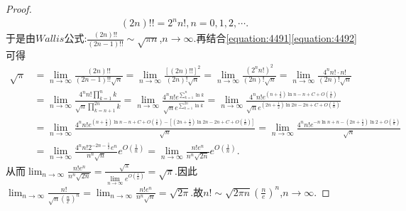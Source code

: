 \documentclass[lang=cn,newtx,10pt,scheme=chinese]{elegantbook}
\begin{document}
\begin{proof}
\begin{align}
(2n)!! = 2^n n!, n = 0,1,2,\cdots.
\end{align}
于是由\(Wallis\)公式:\(\frac{(2n)!!}{(2n - 1)!!}\sim\sqrt{\pi n}\),\(n\rightarrow\infty\).再结合\eqref{equation:4491}\eqref{equation:4492}可得
\begin{align*}
\sqrt{\pi}&=\underset{n\rightarrow \infty}{\lim}\frac{\left( 2n \right) !!}{\left( 2n-1 \right) !!\sqrt{n}}=\underset{n\rightarrow \infty}{\lim}\frac{\left[ \left( 2n \right) !! \right] ^2}{\left( 2n \right) !\sqrt{n}}=\underset{n\rightarrow \infty}{\lim}\frac{\left( 2^nn! \right) ^2}{\left( 2n \right) !\sqrt{n}}=\underset{n\rightarrow \infty}{\lim}\frac{4^nn!\cdot n!}{\left( 2n \right) !\sqrt{n}}
\\
&=\underset{n\rightarrow \infty}{\lim}\frac{4^nn!\prod\limits_{k=1}^n{k}}{\sqrt{n}\prod\limits_{k=n+1}^{2n}{k}}=\underset{n\rightarrow \infty}{\lim}\frac{4^nn!e^{\sum\limits_{k=1}^n{\ln k}}}{\sqrt{n}e^{\sum\limits_{k=1}^{2n}{\ln k}}}=\underset{n\rightarrow \infty}{\lim}\frac{4^nn!e^{\left( n+\frac{1}{2} \right) \ln n-n+C+O\left( \frac{1}{n} \right)}}{\sqrt{n}e^{\left( 2n+\frac{1}{2} \right) \ln 2n-2n+C+O\left( \frac{1}{n} \right)}}
\\
&=\underset{n\rightarrow \infty}{\lim}\frac{4^nn!e^{\left( n+\frac{1}{2} \right) \ln n-n+C+O\left( \frac{1}{n} \right) -\left[ \left( 2n+\frac{1}{2} \right) \ln 2n-2n+C+O\left( \frac{1}{n} \right) \right]}}{\sqrt{n}}=\underset{n\rightarrow \infty}{\lim}\frac{4^nn!e^{-n\ln n+n-\left( 2n+\frac{1}{2} \right) \ln 2+O\left( \frac{1}{n} \right)}}{\sqrt{n}}
\\
&=\underset{n\rightarrow \infty}{\lim}\frac{4^nn!2^{-2n-\frac{1}{2}}e^n}{n^n\sqrt{n}}e^{O\left( \frac{1}{n} \right)}=\underset{n\rightarrow \infty}{\lim}\frac{n!e^n}{n^n\sqrt{2n}}e^{O\left( \frac{1}{n} \right)}.
\end{align*}
从而\(\lim_{n\rightarrow\infty}\frac{n!e^n}{n^n\sqrt{2n}}=\frac{\sqrt{\pi}}{\lim\limits_{n\rightarrow\infty}e^{O\left(\frac{1}{n}\right)}}=\sqrt{\pi}\).因此\(\lim_{n\rightarrow\infty}\frac{n!}{\sqrt{n}\left(\frac{n}{e}\right)^n}=\lim_{n\rightarrow\infty}\frac{n!e^n}{n^n\sqrt{n}}=\sqrt{2\pi}\).故\(n!\sim\sqrt{2\pi n}\left(\frac{n}{e}\right)^n\),\(n\rightarrow\infty\).
\end{proof}
\end{document}
